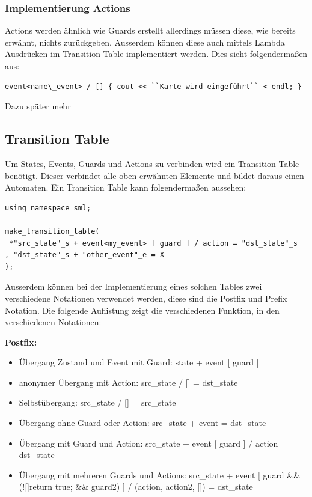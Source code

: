 \documentclass{report}
\begin{document}
\subsubsection{Implementierung Actions}
Actions werden ähnlich wie Guards erstellt allerdings müssen diese, wie bereits erwähnt, nichts zurückgeben. Ausserdem können diese auch mittels Lambda Ausdrücken im Transition Table implementiert werden. Dies sieht folgendermaßen aus:
\begin{lstlisting}
event<name\_event> / [] { cout << ``Karte wird eingeführt`` < endl; }
\end{lstlisting}
Dazu später mehr

\subsection{Transition Table}
Um States, Events, Guards und Actions zu verbinden wird ein Transition Table benötigt. Dieser verbindet alle oben erwähnten Elemente und bildet daraus einen Automaten. Ein Transition Table kann folgendermaßen aussehen:
\begin{lstlisting}
using namespace sml;

make_transition_table(
 *"src_state"_s + event<my_event> [ guard ] / action = "dst_state"_s
, "dst_state"_s + "other_event"_e = X
);
\end{lstlisting}
\vspace{5mm}
Ausserdem können bei der Implementierung eines solchen Tables zwei verschiedene Notationen verwendet werden, diese sind die Postfix und Prefix Notation. 
\newline
Die folgende Auflistung zeigt die verschiedenen Funktion, in den verschiedenen Notationen:

\textbf{Postfix:}
\begin{itemize}
    \item Übergang Zustand und Event mit Guard: \newline state + event [ guard ]
    \item anonymer Übergang mit Action: \newline src\_state / [] {} = dst\_state
    \item Selbstübergang: \newline src\_state / [] {} = src\_state
    \item Übergang ohne Guard oder Action: \newline src\_state + event = dst\_state
    \item Übergang mit Guard und Action: \newline src\_state + event [ guard ] / action = dst\_state	
    \item Übergang mit mehreren Guards und Actions: \newline src\_state + event [ guard \&\& (![]{return true;} \&\& guard2) ] / (action, action2, []{}) = dst\_state	
\end{itemize}
\end{document}
